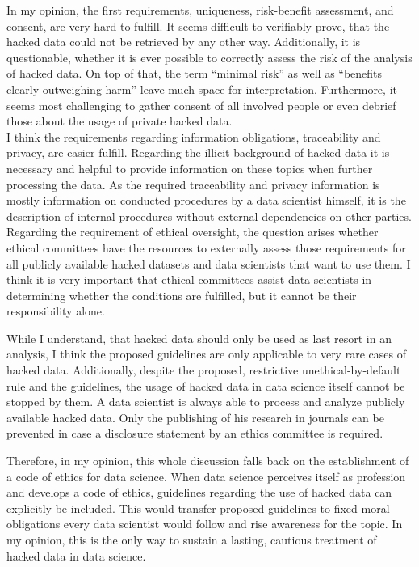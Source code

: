 In my opinion, the first requirements, uniqueness, risk-benefit assessment, and consent, are very hard to fulfill.
It seems difficult to verifiably prove, that the hacked data could not be retrieved by any other way.
Additionally, it is questionable, whether it is ever possible to correctly assess the risk of the analysis of hacked data.
On top of that, the term ``minimal risk'' as well as ``benefits clearly outweighing harm'' leave much space for interpretation.
Furthermore, it seems most challenging to gather consent of all involved people or even debrief those about the usage of private hacked data.\\
I think the requirements regarding information obligations, traceability and privacy, are easier fulfill.
Regarding the illicit background of hacked data it is necessary and helpful to provide information on these topics when further processing the data.
As the required traceability and privacy information is mostly information on conducted procedures by a data scientist himself, it is the description of internal procedures without external dependencies on other parties.\\
Regarding the requirement of ethical oversight, the question arises whether ethical committees have the resources to externally assess those requirements for all publicly available hacked datasets and data scientists that want to use them.
I think it is very important that ethical committees assist data scientists in determining whether the conditions are fulfilled, but it cannot be their responsibility alone.

While I understand, that hacked data should only be used as last resort in an analysis, I think the proposed guidelines are only applicable to very rare cases of hacked data.
Additionally, despite the proposed, restrictive unethical-by-default rule and the guidelines, the usage of hacked data in data science itself cannot be stopped by them.
A data scientist is always able to process and analyze publicly available hacked data.
Only the publishing of his research in journals can be prevented in case a disclosure statement by an ethics committee is required.

Therefore, in my opinion, this whole discussion falls back on the establishment of a code of ethics for data science.
When data science perceives itself as profession and develops a code of ethics, guidelines regarding the use of hacked data can explicitly be included.
This would transfer proposed guidelines to fixed moral obligations every data scientist would follow and rise awareness for the topic.
In my opinion, this is the only way to sustain a lasting, cautious treatment of hacked data in data science.
